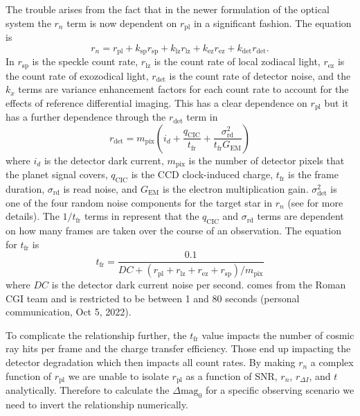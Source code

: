 The trouble arises from the fact that in the newer formulation of the optical
system the $r_n$ term is now dependent on $r_\textrm{pl}$ in a significant
fashion. The equation is
\begin{equation}
  r_n = r_\textrm{pl} + k_\textrm{sp} r_\textrm{sp} + k_\textrm{lz}
  r_\textrm{lz}+ k_\textrm{ez} r_\textrm{ez}+ k_\textrm{det} r_\textrm{det}.
  \label{eq:rn}
\end{equation}
In  $r_\textrm{sp}$ is the speckle count rate, $r_\textrm{lz}$ is the count
rate of local zodiacal light, $r_\textrm{ez}$ is the count rate of
exozodical light, $r_\textrm{det}$ is the count rate of detector noise, and the
$k_x$ terms are variance enhancement factors for each count rate to account for
the effects of reference differential imaging. This has a clear dependence on
$r_\textrm{pl}$ but it has a further dependence through the $r_\textrm{det}$ term
in
\begin{equation}
  r_\textrm{det} =  m_\textrm{pix}\left( i_d +
  \frac{q_\textrm{CIC}}{t_\textrm{fr}} +
\frac{\sigma^2_\textrm{rd}}{t_\textrm{fr} G_\textrm{EM}} \right)
  \label{eq:rdet}
\end{equation}
where $i_d$ is the detector dark current, $m_{\textrm{pix}}$ is the number of
detector pixels that the planet signal covers, $q_{\textrm{CIC}}$ is the CCD
clock-induced charge, $t_{\textrm{fr}}$ is the frame duration,
$\sigma_{\textrm{rd}}$ is read noise, and $G_{\textrm{EM}}$ is the electron
multiplication gain. $\sigma_{\textrm{det}}^2$ is one of the four random noise
components for the target star in $r_{n}$ (see \citet{Nemati2020a}
for more details). The $1/t_{\textrm{fr}}$ terms in
 represent that the $q_\textrm{CIC}$
and $\sigma_\textrm{rd}$ terms are dependent on how many frames are taken over
the course of an observation. The equation for $t_\textrm{fr}$ is 
\begin{equation}
  t_{\textrm{fr}} = \frac{0.1}{DC +\left(r_{\textrm{pl}}+r_{\textrm{lz}}+r_{\textrm{ez}}+r_{\textrm{sp}}\right)/m_{\textrm{pix}}}
  \label{eq:bijan_frame_duration}
\end{equation}
where $DC$ is the detector dark current noise per second.
 comes from the Roman CGI team and is restricted
to be between 1 and 80 seconds (personal communication, Oct 5, 2022).

To complicate the relationship further, the $t_{\textrm{fr}}$ value impacts the
number of cosmic ray hits per frame and the charge transfer efficiency. Those
end up impacting the detector degradation which then impacts all count
rates. 
By making $r_n$ a complex function of $r_\textrm{pl}$ we are unable to isolate
$r_\textrm{pl}$ as a function of SNR, $r_n$, $r_{\Delta I}$, and $t$ analytically. Therefore
to calculate the $\Delta\textrm{mag}_0$ for a specific observing scenario we
need to invert the relationship numerically.

